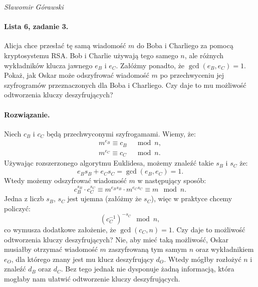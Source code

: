 \documentclass{article}
\begin{document}
\begin{flushright}
\textit{Sławomir Górawski}
\end{flushright}

\paragraph{Lista 6, zadanie 3.}
Alicja chce przesłać tę samą wiadomość $m$ do Boba i Charliego za pomocą kryptosystemu RSA.
Bob i Charlie używają tego samego $n$,
ale różnych wykładników klucza jawnego $e_B$ i $e_C$.
Załóżmy ponadto, że $\gcd(e_B, e_C) = 1$.
Pokaż, jak Oskar może odszyfrować wiadomość $m$
po przechwyceniu jej szyfrogramów przeznaczonych dla Boba i Charliego.
Czy daje to mu możliwość odtworzenia kluczy deszyfrujących?

\paragraph{Rozwiązanie.}
Niech $c_B$ i $c_C$ będą przechwyconymi szyfrogamami.
Wiemy, że:
\begin{align*}
    m^{e_B} \equiv c_B &\mod n, \\
    m^{e_C} \equiv c_C &\mod n.
\end{align*}
Używając rozszerzonego algorytmu Euklidesa,
możemy znaleźć takie $s_B$ i $s_C$ że:
\[
    e_Bs_B + e_Cs_C = \gcd(e_B, e_C) = 1.
\]
Wtedy możemy odszyfrować wiadomość $m$ w następujący sposób:
\[
    c_B^{s_B} \cdot c_C^{s_C} \equiv m^{e_Bs_B} \cdot m^{e_Cs_C} \equiv m \mod n.
\]
Jedna z liczb $s_B$, $s_C$ jest ujemna (załóżmy że $s_C$),
więc w praktyce chcemy policzyć:
\[
    (c_C^{-1})^{-s_C} \mod n,
\]
co wymusza dodatkowe założenie, że $\gcd(c_C, n) = 1$.
Czy daje to możliwość odtworzenia kluczy deszyfrujących?
Nie, aby mieć taką możliwość, Oskar musiałby otrzymać wiadomość $m$
zaszyfrowaną tym samym $n$ oraz wykładnikiem $e_O$,
dla którego znany jest mu klucz deszyfrujący $d_O$.
Wtedy mógłby rozłożyć $n$ i znaleźć $d_B$ oraz $d_C$.
Bez tego jednak nie dysponuje żadną informacją,
która mogłaby nam ułatwić odtworzenie kluczy deszyfrujących.
\end{document}
